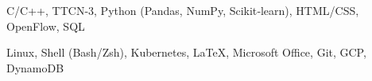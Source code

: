 

\begin{cvskills}

  \cvskill
    { } %
    {C/C++, TTCN-3, Python (Pandas, NumPy, Scikit‑learn), HTML/CSS, OpenFlow, SQL} %

  \cvskill
    { } %
    {Linux, Shell (Bash/Zsh), Kubernetes, \LaTeX, Microsoft Office, Git, GCP, DynamoDB} %
  \cvskill
    { } %
    { } %

\end{cvskills}
